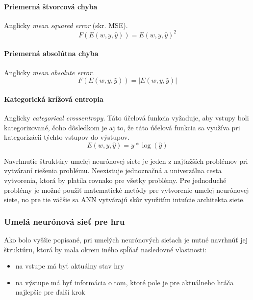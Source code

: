 \paragraph{Priemerná štvorcová chyba}\cite{algo_ann_mse}
Anglicky \emph{mean squared error} (skr. MSE).
\begin{equation}
    F(E(w, y, \hat{y}))=E(w, y, \hat{y})^2
\end{equation}
\paragraph{Priemerná absolútna chyba}\cite{algo_ann_mae}
Anglicky \emph{mean absolute error}.
\begin{equation}
    F(E(w, y, \hat{y}))=|E(w, y, \hat{y})|
\end{equation}
\paragraph{Kategorická krížová entropia}\cite{algo_ann_categorical_crossentropy}
Anglicky \emph{categorical crossentropy}.
Táto účelová funkcia vyžaduje, aby vstupy boli kategorizované, čoho dôsledkom je aj to, že táto účelová funkcia sa
využíva pri kategorizácii týchto vstupov do výstupov.
\begin{equation}
    E(w, y, \hat{y})=y*\log(\hat{y})
\end{equation}

Navrhnutie štruktúry umelej neurónovej siete je jeden z najťažších problémov pri vytváraní riešenia problému.
Neexistuje jednoznačná a univerzálna cesta vytvorenia, ktorá by platila rovnako pre všetky problémy.
Pre jednoduché problémy je možné použiť matematické metódy pre vytvorenie umelej neurónovej siete, no pre tie väčšie
sa ANN vytvárajú skôr využitím intuície architekta siete.

\subsubsection{Umelá neurónová sieť pre hru}

Ako bolo vyššie popísané, pri umelých neurónových sieťach je nutné navrhnúť jej štruktúru, ktorá by mala okrem iného
spĺňať nasledovné vlastnosti:
\begin{itemize}
    \item na vstupe má byť aktuálny stav hry
    \item na výstupe má byť informácia o tom, ktoré pole je pre aktuálneho hráča najlepšie pre ďalší krok
\end{itemize}

